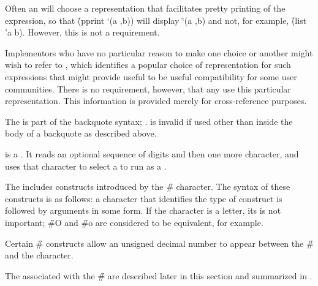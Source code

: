 Often an  will choose a representation that facilitates
pretty printing of the expression, so that \f{(pprint `(a ,b))} will display
\f{`(a ,b)} and not, for example, \f{(list 'a b)}.  However, this is not a
requirement.

Implementors who have no particular reason to make one choice or another
might wish to refer to {\IEEEScheme}, which identifies a popular choice of
representation for such expressions that might provide useful to be useful
compatibility for some user communities.  There is no requirement, however,
that any  use this particular representation.
This information is provided merely for cross-reference purposes.

\endsubsubsection%

\endsubsection%

\idxcode{,}

           
The  is part of the backquote syntax; \seesection\Backquote.
 is invalid if used other than inside the body of a 
backquote  as described above.

\endsubsection%

\idxcode{\#}


 is a  .
It reads an optional 
sequence of digits and then one more character,
and uses that character to select a  to run as a
.

The  includes constructs introduced by the \f{\#} character.
The syntax of these constructs is as follows:
a character that identifies the type of construct is 
followed by arguments in some form.
If the character is a letter, its  is not important;
\f{\#O} and \f{\#o} are considered to be equivalent, for example.

Certain \f{\#} constructs allow an unsigned decimal number to appear
between the \f{\#} and the character.

The  associated with the  \f{\#}
are described later in this section and summarized in \thenextfigure.

